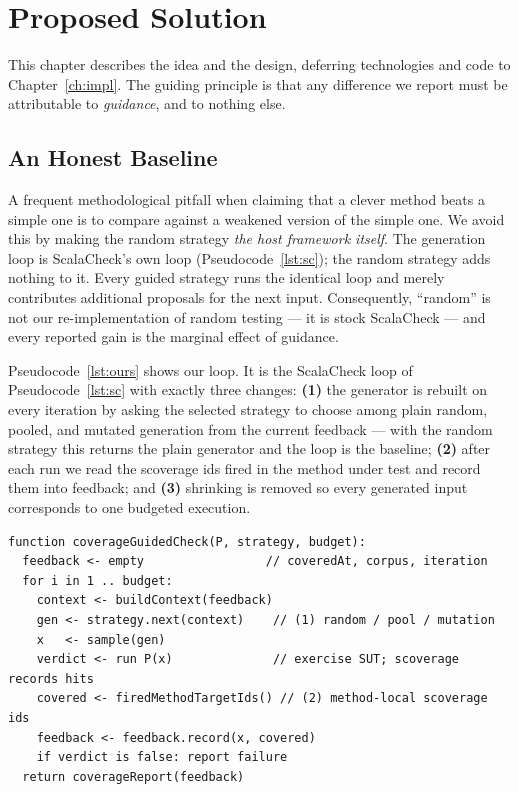 \documentclass[11pt,a4paper]{report}
\begin{document}
\chapter{Proposed Solution}
\label{ch:solution}

This chapter describes the idea and the design, deferring technologies and code to Chapter~\ref{ch:impl}.
The guiding principle is that any difference we report must be attributable to \emph{guidance}, and to
nothing else.

\section{An Honest Baseline}
\label{sec:honest}

A frequent methodological pitfall when claiming that a clever method beats a simple one is to compare
against a weakened version of the simple one. We avoid this by making the random strategy \emph{the host
framework itself}. The generation loop is ScalaCheck's own loop (Pseudocode~\ref{lst:sc}); the random
strategy adds nothing to it. Every guided strategy runs the identical loop and merely contributes additional
proposals for the next input. Consequently, ``random'' is not our re-implementation of random testing — it
is stock ScalaCheck — and every reported gain is the marginal effect of guidance.

Pseudocode~\ref{lst:ours} shows our loop. It is the ScalaCheck loop of Pseudocode~\ref{lst:sc} with exactly
three changes: \textbf{(1)} the generator is rebuilt on every iteration by asking the selected strategy to
choose among plain random, pooled, and mutated generation from the current feedback — with the random
strategy this returns the plain generator and the loop is the baseline; \textbf{(2)} after each run we read
the scoverage ids fired in the method under test and record them into feedback; and \textbf{(3)} shrinking is
removed so every generated input corresponds to one budgeted execution.

\begin{lstlisting}[caption={Our coverage-guided loop: the ScalaCheck loop plus (1) feedback-driven generation, (2) scoverage-id feedback, and (3) no shrinking. With the random strategy it is exactly the baseline.},label=lst:ours]
function coverageGuidedCheck(P, strategy, budget):
  feedback <- empty                 // coveredAt, corpus, iteration
  for i in 1 .. budget:
    context <- buildContext(feedback)
    gen <- strategy.next(context)    // (1) random / pool / mutation
    x   <- sample(gen)
    verdict <- run P(x)              // exercise SUT; scoverage records hits
    covered <- firedMethodTargetIds() // (2) method-local scoverage ids
    feedback <- feedback.record(x, covered)
    if verdict is false: report failure
  return coverageReport(feedback)
\end{lstlisting}
\end{document}
